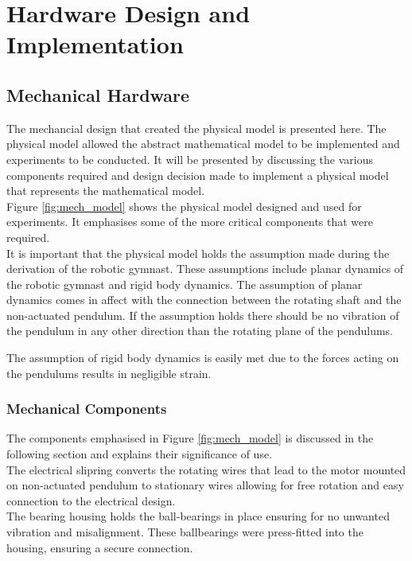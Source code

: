 \chapter{Hardware Design and Implementation}


\section{Mechanical Hardware}
The mechancial design that created the physical model is presented here. The physical model allowed the abstract mathematical model to be implemented and experiments to be conducted. It will be presented by discussing the various components required and design decision made to implement a physical model that represents the mathematical model.\\

Figure \ref{fig:mech_model} shows the physical model designed and used for experiments. It emphasises some of the more critical components that were required.\\

It is important that the physical model holds the assumption made during the derivation of the robotic gymnast. These assumptions include planar dynamics of the robotic gymnast and rigid body dynamics. The assumption of planar dynamics comes in affect with the connection between the rotating shaft and the non-actuated pendulum. If the assumption holds there should be no vibration of the pendulum in any other direction than the rotating plane of the pendulums. 

The assumption of rigid body dynamics is easily met due to the forces acting on the pendulums results in negligible strain.

\subsection{Mechanical Components}
The components emphasised in Figure \ref{fig:mech_model} is discussed in the following section and explains their significance of use.\\

The electrical slipring converts the rotating wires that lead to the motor mounted on non-actuated pendulum to stationary wires allowing for free rotation and easy connection to the electrical design.\\

The bearing housing holds the ball-bearings in place ensuring for no unwanted vibration and misalignment. These ballbearings were press-fitted into the housing, ensuring a secure connection.\\

